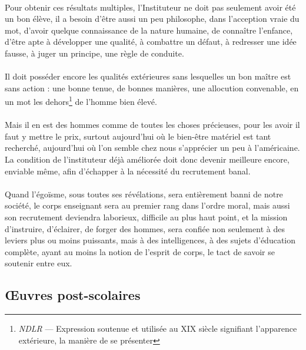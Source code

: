 \documentclass[../eBook.tex]{subfiles}
\begin{document}
    \paragraph{}Pour obtenir ces résultats multiples, l'Instituteur ne doit pas seulement avoir été un bon élève, il a besoin d'être aussi un peu philosophe, dans l'acception vraie du mot, d'avoir quelque connaissance de la nature humaine, de connaître l'enfance, d'être apte à développer une qualité, à combattre un défaut, à redresser une idée fausse, à juger un principe, une règle de conduite.
    \paragraph{}Il doit posséder encore les qualités extérieures sans lesquelles un bon maître est sans action : une bonne tenue, de bonnes manières, une allocution convenable, en un mot les dehors\footnote{\textit{NDLR} --- Expression soutenue et utilisée au XIX siècle signifiant l’apparence extérieure, la manière de se présenter} de l'homme bien élevé.
    \paragraph{}Mais il en est des hommes comme de toutes les choses précieuses, pour les avoir il faut y mettre le prix, surtout aujourd'hui où le bien-être matériel est tant recherché, aujourd'hui où l'on semble chez nous s'apprécier un peu à l'américaine. La condition de l'instituteur déjà améliorée doit donc devenir meilleure encore, enviable même, afin d'échapper à la nécessité du recrutement banal.
    \paragraph{}Quand l'égoïsme, sous toutes ses révélations, sera entièrement banni de notre société, le corps enseignant sera au premier rang dans l'ordre moral, mais aussi son recrutement deviendra laborieux, difficile au plus haut point, et la mission d'instruire, d'éclairer, de forger des hommes, sera confiée non seulement à des leviers plus ou moins puissants, mais à des intelligences, à des sujets d'éducation complète, ayant au moins la notion de l'esprit de corps, le tact de savoir se soutenir entre eux.

  \subsection*{Œuvres post-scolaires}
\end{document}
